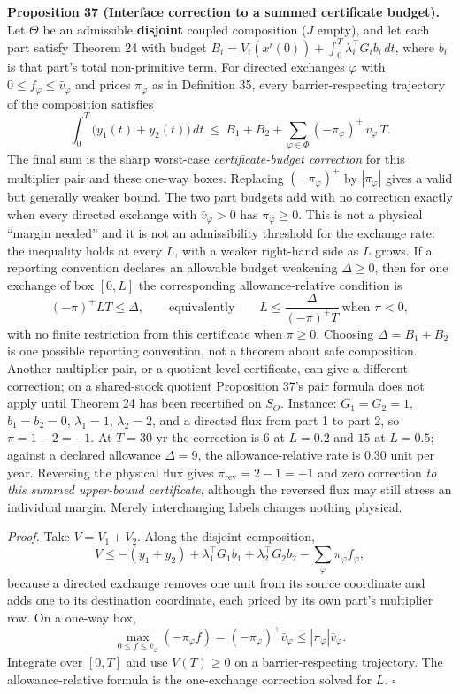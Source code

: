 \documentclass[11pt]{article}
\begin{document}
\textbf{Proposition 37 (Interface correction to a summed certificate budget).} Let \(\Theta\) be an admissible \textbf{disjoint} coupled composition (\(J\) empty), and let each part satisfy Theorem 24 with budget \(B_i = V_i(x^i(0)) + \int_0^T \lambda_i^{\top} G_i b_i\,dt\), where \(b_i\) is that part's total non-primitive term. For directed exchanges \(\varphi\) with \(0\le f_\varphi\le\bar v_\varphi\) and prices \(\pi_\varphi\) as in Definition 35, every barrier-respecting trajectory of the composition satisfies
\[
\int_0^T\bigl(y_1(t)+y_2(t)\bigr)\,dt
\ \le\
B_1+B_2+\sum_{\varphi\in\Phi}(-\pi_\varphi)^+\,\bar v_\varphi\,T .
\]
The final sum is the sharp worst-case \emph{certificate-budget correction} for this multiplier pair and these one-way boxes. Replacing \((-\pi_\varphi)^+\) by \(|\pi_\varphi|\) gives a valid but generally weaker bound. The two part budgets add with no correction exactly when every directed exchange with \(\bar v_\varphi>0\) has \(\pi_\varphi\ge0\). This is not a physical ``margin needed'' and it is not an admissibility threshold for the exchange rate: the inequality holds at every \(L\), with a weaker right-hand side as \(L\) grows. If a reporting convention declares an allowable budget weakening \(\Delta\ge0\), then for one exchange of box \([0,L]\) the corresponding allowance-relative condition is
\[
(-\pi)^+LT\le\Delta,
\qquad\text{equivalently}\qquad
L\le \frac{\Delta}{(-\pi)^+T}\ \text{when }\pi<0,
\]
with no finite restriction from this certificate when \(\pi\ge0\). Choosing \(\Delta=B_1+B_2\) is one possible reporting convention, not a theorem about safe composition. Another multiplier pair, or a quotient-level certificate, can give a different correction; on a shared-stock quotient Proposition 37's pair formula does not apply until Theorem 24 has been recertified on \(S_\Theta\). Instance: \(G_1=G_2=1\), \(b_1=b_2=0\), \(\lambda_1=1\), \(\lambda_2=2\), and a directed flux from part 1 to part 2, so \(\pi=1-2=-1\). At \(T=30\) yr the correction is \(6\) at \(L=0.2\) and \(15\) at \(L=0.5\); against a declared allowance \(\Delta=9\), the allowance-relative rate is \(0.30\) unit per year. Reversing the physical flux gives \(\pi_{\mathrm{rev}}=2-1=+1\) and zero correction \emph{to this summed upper-bound certificate}, although the reversed flux may still stress an individual margin. Merely interchanging labels changes nothing physical.

\emph{Proof.} Take \(V=V_1+V_2\). Along the disjoint composition,
$$\dot V\le-(y_1+y_2)+\lambda_1^\top G_1b_1+\lambda_2^\top G_2b_2-\sum_\varphi\pi_\varphi f_\varphi,$$
because a directed exchange removes one unit from its source coordinate and adds one to its destination coordinate, each priced by its own part's multiplier row. On a one-way box,
$$\max_{0\le f\le\bar v_\varphi}(-\pi_\varphi f)=(-\pi_\varphi)^+\bar v_\varphi\le|\pi_\varphi|\bar v_\varphi.$$
Integrate over \([0,T]\) and use \(V(T)\ge0\) on a barrier-respecting trajectory. The allowance-relative formula is the one-exchange correction solved for \(L\). \(\square\)
\end{document}
